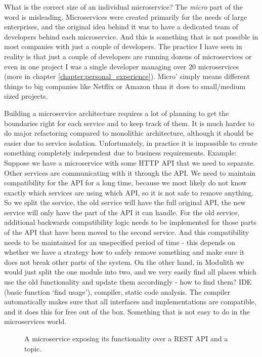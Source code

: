 What is the correct size of an individual microservice? The \textit{micro} part of the word is misleading. Microservices were created primarily for the needs of large enterprises, and the original idea behind it was to have a dedicated team of developers behind each microservice. And this is something that is not possible in most companies with just a couple of developers. The practice I have seen in reality is that just a couple of developers are running dozens of microservices or even in one project I was a single developer managing over 20 microservices (more in chapter \ref{chapter:personal_experience}). Micro' simply means different things to big companies like Netflix or Amazon than it does to small/medium sized projects.

Building a microservice architecture requires a lot of planning to get the boundaries right for each service and to keep track of them. It is much harder to do major refactoring compared to monolithic architecture, although it should be easier due to service isolation. Unfortunately, in practice it is impossible to create something completely independent due to business requirements. Example: Suppose we have a microservice with some HTTP API that we need to separate. Other services are communicating with it through the API. We need to maintain compatibility for the API for a long time, because we most likely do not know exactly which services are using which API, so it is not safe to remove anything. So we split the service, the old service will have the full original API, the new service will only have the part of the API it can handle. For the old service, additional backwards compatibility logic needs to be implemented for those parts of the API that have been moved to the second service. And this compatibility needs to be maintained for an unspecified period of time - this depends on whether we have a strategy how to safely remove something and make sure it does not break other parts of the system. On the other hand, in Modulith we would just split the one module into two, and we very easily find all places which use the old functionality and update them accordingly - how to find them? IDE (basic function `find usage'), compiler, static code analysis. The compiler automatically makes sure that all interfaces and implementations are compatible, and it does this for free out of the box. Something that is not easy to do in the microservices world.


\begin{figure}
    \centering
    
    \caption{A microservice exposing its functionality over a REST API and a topic. \cite{BUILDING_MS_WHAT_ARE}\label{img:microservices_basic}}
\end{figure}



